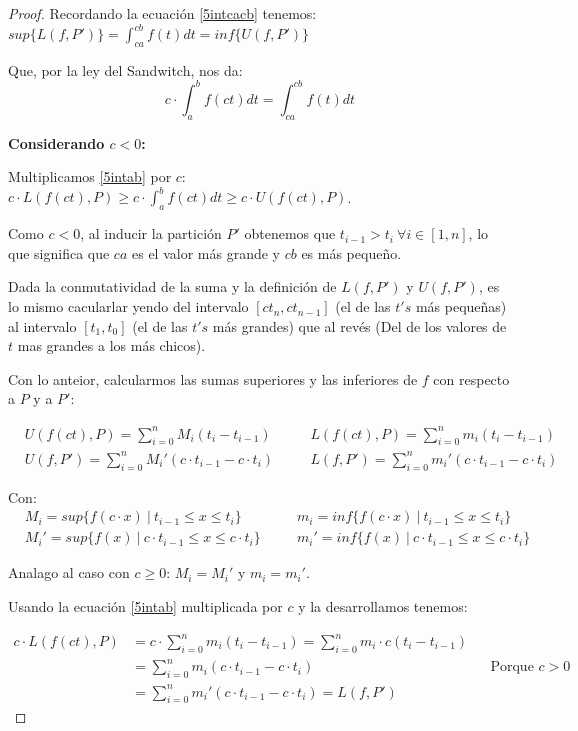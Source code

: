 \documentclass[12pt]{article}
\begin{document}
\begin{proof}
    Recordando la ecuaci\'on \eqref{5intcacb} tenemos: \(sup\{L(f,P')\}=\displaystyle\int_{ca}^{cb}f(t)dt=inf\{U(f,P')\}\)

    Que, por la ley del Sandwitch, nos da:
    \begin{equation*}
        c\cdot\int_{a}^{b}f(ct)dt=\int_{ca}^{cb}f(t)dt
    \end{equation*}

    \textbf{Considerando $c<0$:}\bigskip

    Multiplicamos \eqref{5intab} por $c$: \quad \(c\cdot L(f(ct),P)\geq c\cdot\int_{a}^{b}f(ct)dt\geq c\cdot U(f(ct),P)\).\bigskip

    Como $c<0$, al inducir la partici\'on $P'$ obtenemos que $t_{i-1}>t_i \ \forall i \in[1,n]$, lo que significa que $ca$ es el valor m\'as grande y $cb$ es m\'as pequeño.\bigskip

    Dada la conmutatividad de la suma y la definici\'on de $L(f,P')$ y $U(f,P')$, es lo mismo cacularlar yendo del intervalo $[ct_n,ct_{n-1}]$ (el de las $t's$ m\'as pequeñas) al intervalo $[t_1,t_0]$ (el de las $t's$ m\'as grandes) que al rev\'es (Del de los valores de $t$ mas grandes a los m\'as chicos).\bigskip

    Con lo anteior, calcularmos las sumas superiores y las inferiores de $f$ con respecto a $P$ y a $P'$:

    \begin{align*}
        &U(f(ct),P)=\sum_{i=0}^n M_i(t_i-t_{i-1}) \quad &&L(f(ct),P)=\sum_{i=0}^n m_i(t_i-t_{i-1})\\
        &U(f,P')=\sum_{i=0}^n M_i'(c\cdot t_{i-1}-c\cdot t_i) \quad &&L(f,P')=\sum_{i=0}^n m_i'(c\cdot t_{i-1}-c\cdot t_i)
    \end{align*}

    Con:
    \begin{align*}
        &M_i=sup\{f(c\cdot x) \ | \ t_{i-1}\leq x\leq t_i\} \quad &&m_i=inf\{f(c\cdot x) \ | \ t_{i-1}\leq x\leq t_i\}\\
        &M_i'=sup\{f(x) \ | \ c\cdot t_{i-1}\leq x\leq c\cdot t_i\} \quad &&m_i'=inf\{f(x) \ | \ c\cdot t_{i-1}\leq x\leq c\cdot t_i\}
    \end{align*}

    Analago al caso con $c\geq0$: $M_i=M_i'$ y $m_i=m_i'$.

    Usando la ecuaci\'on \eqref{5intab} multiplicada por $c$ y la desarrollamos tenemos:

    \begin{align*}
        c\cdot L(f(ct),P) &= c \cdot \sum_{i=0}^n m_i(t_i-t_{i-1}) = \sum_{i=0}^n m_i\cdot c(t_i-t_{i-1}) \\
        &= \sum_{i=0}^n m_i(c\cdot t_{i-1}-c\cdot t_i) \quad &&\text{Porque $c>0$}\\
        &= \sum_{i=0}^n m_i'(c\cdot t_{i-1}-c\cdot t_i) = L(f,P')
    \end{align*}


\end{proof}
\end{document}
